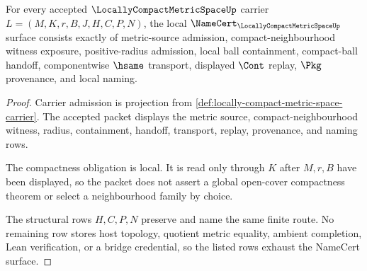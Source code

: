 \begin{theorem}
\label{thm:locally-compact-metric-space-namecert-obligations}
For every accepted $\LocallyCompactMetricSpaceUp$ carrier $L=(M,K,r,B,J,H,C,P,N)$, the local $\NameCert_{\LocallyCompactMetricSpaceUp}$ surface consists exactly of metric-source admission, compact-neighbourhood witness exposure, positive-radius admission, local ball containment, compact-ball handoff, componentwise $\hsame$ transport, displayed $\Cont$ replay, $\Pkg$ provenance, and local naming.
\end{theorem}
\begin{proof}
Carrier admission is projection from \autoref{def:locally-compact-metric-space-carrier}. The accepted packet displays the metric source, compact-neighbourhood witness, radius, containment, handoff, transport, replay, provenance, and naming rows.

The compactness obligation is local. It is read only through $K$ after $M,r,B$ have been displayed, so the packet does not assert a global open-cover compactness theorem or select a neighbourhood family by choice.

The structural rows $H,C,P,N$ preserve and name the same finite route. No remaining row stores host topology, quotient metric equality, ambient completion, Lean verification, or a bridge credential, so the listed rows exhaust the NameCert surface.
\end{proof}





